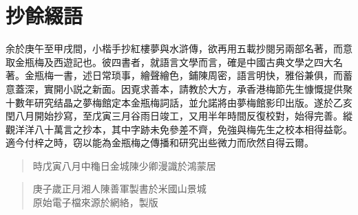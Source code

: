 \chapter*{抄餘綴語}


余於庚午至甲戌間，小楷手抄紅樓夢與水滸傳，欲再用五載抄閱另兩部名著，而意取金瓶梅及西遊記也。彼四書者，就語言文學而言，確是中國古典文學之四大名著。金瓶梅一書，述日常琐事，繪聲繪色，鋪陳周密，語言明快，雅俗兼俱，而蓄意蓋深，實開小説之新面。因覔求善本，請教於大方，承香港梅節先生慷慨提供聚十數年研究结晶之夢梅館定本金瓶梅詞話，並允諾將由夢梅館影印出版。遂於乙亥閏八月開始抄寫，至戊寅三月谷雨日竣工，又用半年時間反復校對，始得完善。縱觀洋洋八十萬言之抄本，其中字跡未免參差不齊，免強與梅先生之校本相得益彰。適今付梓之時，窃以能為金瓶梅之傳播和研究出些微力而欣然自得云爾。

\begin{quotation}\begin{flushright}時戊寅八月中龝日金城陳少卿漫識於鴻蒙居\end{flushright}\end{quotation}


\begin{quotation}\small\color{gray}

\begin{flushright}
庚子歲正月湘人陳善軍製書於米國山景城\\
原始電子檔來源於網絡，\quad{\LaTeX}製版
\end{flushright}
\end{quotation}

